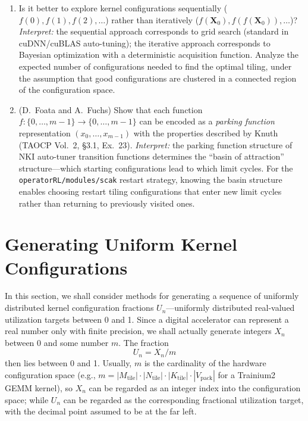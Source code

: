 \documentclass[12pt]{article}
\begin{document}
\begin{enumerate}
\item[\textbf{22.}] [21] Is it better to explore kernel configurations sequentially ($f(0), f(1), f(2), \ldots$) rather than iteratively ($f(\mathbf{X}_0), f(f(\mathbf{X}_0)), \ldots$)? \emph{Interpret:} the sequential approach corresponds to grid search (standard in cuDNN/cuBLAS auto-tuning); the iterative approach corresponds to Bayesian optimization with a deterministic acquisition function. Analyze the expected number of configurations needed to find the optimal tiling, under the assumption that good configurations are clustered in a connected region of the configuration space.

\item[\textbf{23.}] [$M26$] (D.~Foata and A.~Fuchs) Show that each function $f\colon \{0, \ldots, m-1\} \to \{0, \ldots, m-1\}$ can be encoded as a \emph{parking function} representation $(x_0, \ldots, x_{m-1})$ with the properties described by Knuth (TAOCP Vol.~2, \S3.1, Ex.~23). \emph{Interpret:} the parking function structure of NKI auto-tuner transition functions determines the ``basin of attraction'' structure---which starting configurations lead to which limit cycles. For the \texttt{operatorRL/modules/scak} restart strategy, knowing the basin structure enables choosing restart tiling configurations that enter new limit cycles rather than returning to previously visited ones.

\end{enumerate}


\section{Generating Uniform Kernel Configurations}
\label{sec:3.2}

In this section, we shall consider methods for generating a sequence of uniformly distributed kernel configuration fractions $U_n$---uniformly distributed real-valued utilization targets between 0 and 1. Since a digital accelerator can represent a real number only with finite precision, we shall actually generate integers $X_n$ between 0 and some number $m$. The fraction
\[
U_n = X_n / m
\]
then lies between 0 and 1. Usually, $m$ is the cardinality of the hardware configuration space (e.g., $m = |M_{\mathrm{tile}}| \cdot |N_{\mathrm{tile}}| \cdot |K_{\mathrm{tile}}| \cdot |V_{\mathrm{pack}}|$ for a Trainium2 GEMM kernel), so $X_n$ can be regarded as an integer index into the configuration space; while $U_n$ can be regarded as the corresponding fractional utilization target, with the decimal point assumed to be at the far left.
\end{document}
